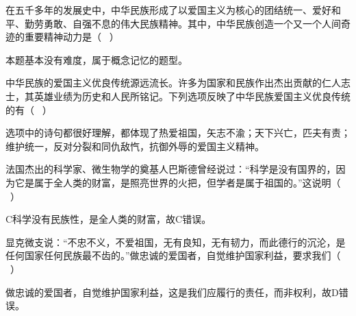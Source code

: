 \question 在五千多年的发展史中，中华民族形成了以爱国主义为核心的团结统一、爱好和平、勤劳勇敢、自强不息的伟大民族精神。其中，中华民族创造一个又一个人间奇迹的重要精神动力是（
~）
\par{}
\begin{solution}本题基本没有难度，属于概念记忆的题型。
\end{solution}
\question 中华民族的爱国主义优良传统源远流长。许多为国家和民族作出杰出贡献的仁人志士，其英雄业绩为历史和人民所铭记。下列选项反映了中华民族爱国主义优良传统的有（
~）
\par\fourch{\textcolor{red}{“人生自古谁无死，留取丹心照汗青”}}{\textcolor{red}{“怒发冲冠”、“还我河山”}}{\textcolor{red}{“王师北定中原日，家祭无忘告乃翁”}}{\textcolor{red}{“一年三百六十日，多是横戈马上行”}}
\begin{solution}选项中的诗句都很好理解，都体现了热爱祖国，矢志不渝；天下兴亡，匹夫有责；维护统一，反对分裂和同仇敌忾，抗御外辱的爱国主义精神。
\end{solution}
\question 法国杰出的科学家、微生物学的奠基人巴斯德曾经说过：``科学是没有国界的，因为它是属于全人类的财富，是照亮世界的火把，但学者是属于祖国的。''这说明（
~）
\par{}
\begin{solution}C科学没有民族性，是全人类的财富，故C错误。
\end{solution}
\question 显克微支说：``不忠不义，不爱祖国，无有良知，无有韧力，而此德行的沉沦，是任何国家任何民族最不齿的。''做忠诚的爱国者，自觉维护国家利益，要求我们（
~）
\par{}
\begin{solution}做忠诚的爱国者，自觉维护国家利益，这是我们应履行的责任，而非权利，故D错误。
\end{solution}

